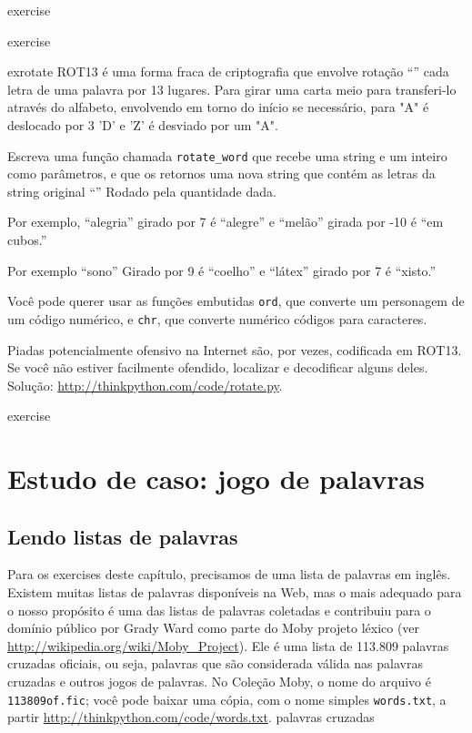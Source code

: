 \documentclass[10pt]{book}
\begin{document}
\begin{exercise}
\begin{}
\end{} exercise


\begin{} exercise

\label{} exrotate
ROT13 é uma forma fraca de criptografia que envolve rotação ``'' cada
letra de uma palavra por 13 lugares. Para girar uma carta meio
para transferi-lo através do alfabeto, envolvendo em torno do início se
necessário, para "A" é deslocado por 3 'D' e 'Z' é desviado por um "A".

Escreva uma função chamada \verb "rotate_word"
que recebe uma string e um inteiro como parâmetros, e que os retornos
uma nova string que contém as letras da string original
``'' Rodado pela quantidade dada.  

Por exemplo, ``alegria'' girado por 7 é ``alegre'' e ``melão'' girada
por -10 é ``em cubos.''  

Por exemplo ``sono''
Girado por 9 é ``coelho'' e ``látex'' girado por 7 é ``xisto.''

Você pode querer usar as funções embutidas {\tt ord}, ​​que converte
um personagem de um código numérico, e {\tt chr}, ​​que converte numérico
códigos para caracteres.

Piadas potencialmente ofensivo na Internet são, por vezes, codificada
em ROT13. Se você não estiver facilmente ofendido, localizar e decodificar alguns
deles. Solução: \url{http://thinkpython.com/code/rotate.py}.

\end{} exercise


\chapter{Estudo de caso: jogo de palavras}

\section{Lendo listas de palavras}
\label{lista de palavras}

Para os exercises deste capítulo, precisamos de uma lista de palavras em inglês.
Existem muitas listas de palavras disponíveis na Web, mas o mais
adequado para o nosso propósito é uma das listas de palavras coletadas e
contribuiu para o domínio público por Grady Ward como parte do Moby
projeto léxico (ver \url{http://wikipedia.org/wiki/Moby_Project}). Ele
é uma lista de 113.809 palavras cruzadas oficiais, ou seja, palavras que são
considerada válida nas palavras cruzadas e outros jogos de palavras. No
Coleção Moby, o nome do arquivo é {\tt 113809of.fic}; você pode baixar
uma cópia, com o nome simples {\tt words.txt}, a partir
\url{http://thinkpython.com/code/words.txt}.
\index{} palavras cruzadas


\end{exercise}
\end{document}
